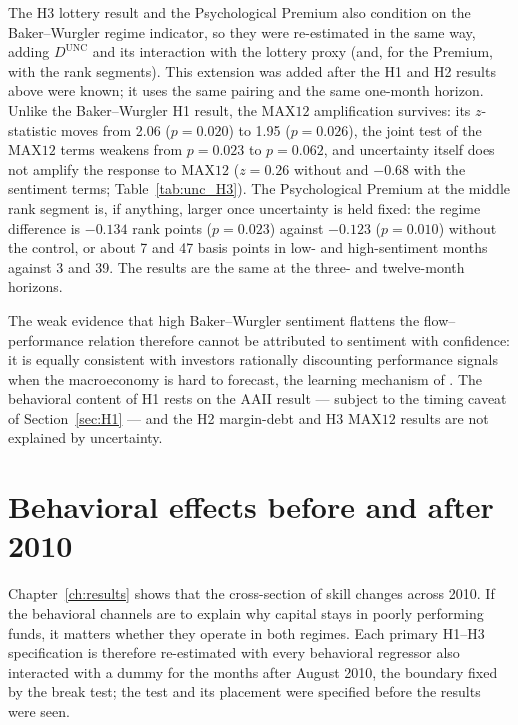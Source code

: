 \documentclass[12pt, oneside]{report}
\begin{document}
The H3 lottery result and the Psychological Premium also condition on
the Baker--Wurgler regime indicator, so they were re-estimated in the
same way, adding $D^{\text{UNC}}$ and its interaction with the lottery
proxy (and, for the Premium, with the rank segments). This extension
was added after the H1 and H2 results above were known; it uses the
same pairing and the same one-month horizon. Unlike the Baker--Wurgler
H1 result, the
$\text{MAX12}$ amplification survives: its $z$-statistic moves from
2.06 ($p = 0.020$) to 1.95 ($p = 0.026$), the joint test of the
$\text{MAX12}$ terms weakens from $p = 0.023$ to $p = 0.062$, and
uncertainty itself does not amplify the response to $\text{MAX12}$
($z = 0.26$ without and $-0.68$ with the sentiment terms;
Table~\ref{tab:unc_H3}). The Psychological Premium at the middle rank
segment is, if anything, larger once uncertainty is held fixed: the
regime difference is $-0.134$ rank points ($p = 0.023$) against $-0.123$
($p = 0.010$) without the control, or about 7 and 47 basis points in
low- and high-sentiment months against 3 and 39. The results are the same
at the three- and twelve-month horizons.

The weak evidence that high Baker--Wurgler sentiment flattens the
flow--performance relation therefore cannot be attributed to sentiment
with confidence: it is equally consistent with investors rationally
discounting performance signals when the macroeconomy is hard to
forecast, the learning mechanism of \textcite{BerkGreen2004}. The
behavioral content of H1 rests on the AAII result --- subject to the
timing caveat of Section~\ref{sec:H1} --- and the H2 margin-debt and H3
$\text{MAX12}$ results are not explained by uncertainty.

\section{Behavioral effects before and after 2010}
\label{sec:regime_behavioral}

\noindent Chapter~\ref{ch:results} shows that the cross-section of skill
changes across 2010. If the behavioral channels are to explain why
capital stays in poorly performing funds, it matters whether they operate
in both regimes. Each primary H1--H3 specification is therefore re-estimated
with every behavioral regressor also interacted with a dummy for the
months after August 2010, the boundary fixed by the break test; the test
and its placement were specified before the results were seen.


\end{document}
